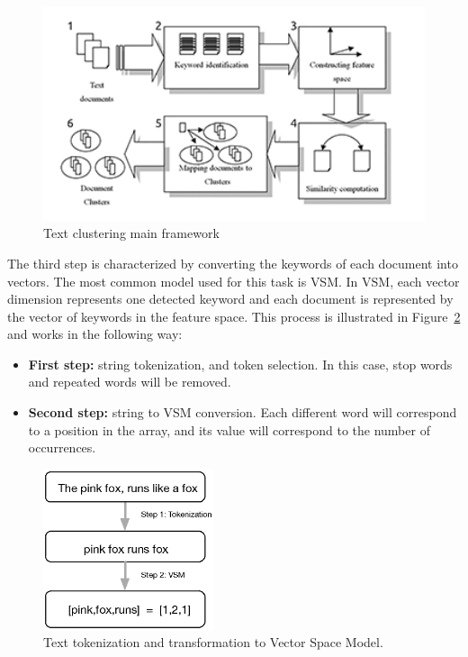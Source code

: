 \begin{figure}
  \begin{center}
    \includegraphics[width=12cm]{images/1_Text_Clustering_Main_Framwork.png}
  \end{center}
  \caption{ Text clustering main framework~\cite{Dozono2012} }
  \label{fig:1_Text_Clustering_Main_Framwork}
\end{figure}

The third step is characterized by converting the keywords of each document into vectors. The most common model used for this task is \ac{VSM}. In \ac{VSM}, each vector dimension represents one detected keyword and each document is represented by the vector of keywords in the feature space. This process is illustrated in Figure~\ref{fig:2_svm} and works in the following way:
\begin{itemize}
  \item \textbf{First step:} string tokenization, and token selection. In this case, stop words and repeated words will be removed.
  \item \textbf{Second step:} string to \ac{VSM} conversion. Each different word will correspond to a position in the array, and its value will correspond to the number of occurrences. 
\end{itemize}

\begin{figure}
  \begin{center}
    \includegraphics[width=5cm]{images/2_svm.eps}
  \end{center}
  \caption{ Text tokenization and transformation to Vector Space Model. }
  \label{fig:2_svm}
\end{figure}

